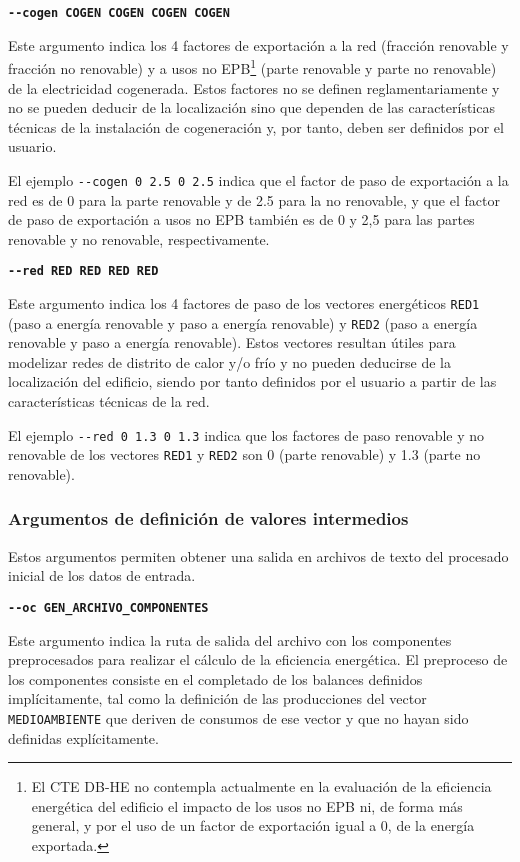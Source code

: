\documentclass[10pt,notitlepage,oneside,a4paper]{article}
\begin{document}
\textbf{\texttt{-{}-cogen COGEN COGEN COGEN COGEN}}

Este argumento indica los 4 factores de exportación a la red (fracción renovable y fracción no renovable) y a usos no EPB\footnote{El CTE DB-HE no contempla actualmente en la evaluación de la eficiencia energética del edificio el impacto de los usos no EPB ni, de forma más general, y por el uso de un factor de exportación igual a 0, de la energía exportada.} (parte renovable y parte no renovable) de la electricidad cogenerada. Estos factores no se definen reglamentariamente y no se pueden deducir de la localización sino que dependen de las características técnicas de la instalación de cogeneración y, por tanto, deben ser definidos por el usuario.

El ejemplo \texttt{-{}-cogen 0 2.5 0 2.5} indica que el factor de paso de exportación a la red es de 0 para la parte renovable y de 2.5 para la no renovable, y que el factor de paso de exportación a usos no EPB también es de 0 y 2,5 para las partes renovable y no renovable, respectivamente.

\textbf{\texttt{-{}-red RED RED RED RED}}

Este argumento indica los 4 factores de paso de los vectores energéticos \texttt{RED1} (paso a energía renovable y paso a energía renovable) y \texttt{RED2} (paso a energía renovable y paso a energía renovable). Estos vectores resultan útiles para modelizar redes de distrito de calor y/o frío y no pueden deducirse de la localización del edificio, siendo por tanto definidos por el usuario a partir de las características técnicas de la red.

El ejemplo \texttt{-{}-red 0 1.3 0 1.3} indica que los factores de paso renovable y no renovable de los vectores \texttt{RED1} y \texttt{RED2} son 0 (parte renovable) y 1.3 (parte no renovable).

\subsubsection{Argumentos de definición de valores intermedios}

Estos argumentos permiten obtener una salida en archivos de texto del procesado inicial de los datos de entrada.

\textbf{\texttt{-{}-oc GEN\_ARCHIVO\_COMPONENTES}}

Este argumento indica la ruta de salida del archivo con los componentes preprocesados para realizar el cálculo de la eficiencia energética. El preproceso de los componentes consiste en el completado de los balances definidos implícitamente, tal como la definición de las producciones del vector \texttt{MEDIOAMBIENTE} que deriven de consumos de ese vector y que no hayan sido definidas explícitamente.
\end{document}
